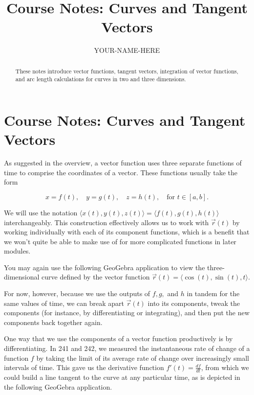 \documentclass{ximera}
\title{Course Notes: Curves and Tangent Vectors}
\author{YOUR-NAME-HERE}
\begin{document}
\begin{abstract}
These notes introduce vector functions, tangent vectors, integration of vector functions, and arc length calculations for curves in two and three dimensions.
\end{abstract}
\maketitle

\section{Course Notes: Curves and Tangent Vectors}

As suggested in the overview, a vector function uses three separate functions of time to comprise the coordinates of a vector. These functions usually take the form

$$x=f(t), \quad y=g(t), \quad z=h(t), \quad \text{for } t \in [a,b].$$

We will use the notation $\langle x(t),y(t),z(t)\rangle=\langle f(t),g(t),h(t)\rangle$ interchangeably. This construction effectively allows us to work with $\vec{r}(t)$ by working individually with each of its component functions, which is a benefit that we won't quite be able to make use of for more complicated functions in later modules.

You may again use the following GeoGebra application to view the three-dimensional curve defined by the vector function $\vec{r}(t)=\langle \cos(t), \sin(t), t\rangle$.

\begin{center}
\end{center}

For now, however, because we use the outputs of $f, g,$ and $h$ in tandem for the same values of time, we can break apart $\vec{r}(t)$ into its components, tweak the components (for instance, by differentiating or integrating), and then put the new components back together again.

One way that we use the components of a vector function productively is by differentiating. In 241 and 242, we measured the instantaneous rate of change of a function $f$ by taking the limit of its average rate of change over increasingly small intervals of time. This gave us the derivative function $f'(t)=\frac{df}{dt}$, from which we could build a line tangent to the curve at any particular time, as is depicted in the following GeoGebra application.
\end{document}
